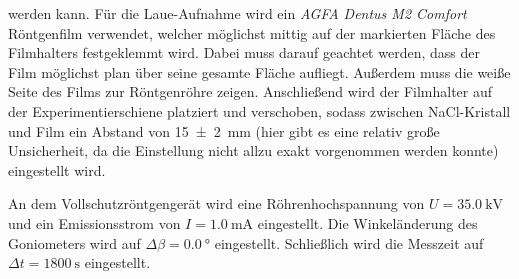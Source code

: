 werden kann. Für die Laue-Aufnahme wird ein \textit{AGFA Dentus M2 Comfort} Röntgenfilm verwendet, welcher möglichst mittig auf der markierten Fläche
des Filmhalters festgeklemmt wird. Dabei muss darauf geachtet werden, dass der Film möglichst plan über seine gesamte Fläche aufliegt. Außerdem muss die weiße Seite des
Films zur Röntgenröhre zeigen. Anschließend wird der Filmhalter auf der Experimentierschiene platziert und verschoben, sodass zwischen NaCl-Kristall und Film ein Abstand von \SI{15(2)}{\milli \meter} (hier gibt es eine relativ große Unsicherheit,
da die Einstellung nicht allzu exakt vorgenommen werden konnte) eingestellt wird.\par
An dem Vollschutzröntgengerät wird eine Röhrenhochspannung von $U = \SI{35,0}{\kilo \volt}$ und ein Emissionsstrom von $I = \SI{1,0}{\milli \ampere}$ eingestellt.
Die Winkeländerung des Goniometers wird auf $\Delta \beta = \SI{0,0}{\degree}$ eingestellt. Schließlich wird die Messzeit auf $\Delta t = \SI{1800}{\second}$ eingestellt.
